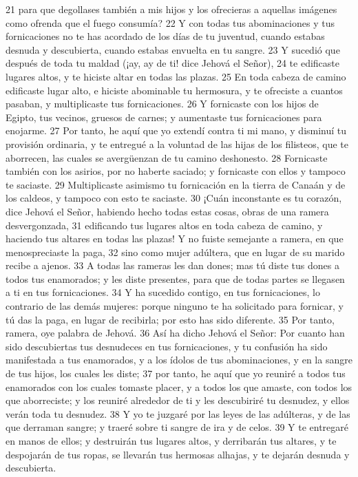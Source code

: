 21 para que degollases también a mis hijos y los ofrecieras a aquellas imágenes como ofrenda que el fuego consumía?
22 Y con todas tus abominaciones y tus fornicaciones no te has acordado de los días de tu juventud, cuando estabas desnuda y descubierta, cuando estabas envuelta en tu sangre.
23 Y sucedió que después de toda tu maldad (¡ay, ay de ti! dice Jehová el Señor),
24 te edificaste lugares altos, y te hiciste altar en todas las plazas.
25 En toda cabeza de camino edificaste lugar alto, e hiciste abominable tu hermosura, y te ofreciste a cuantos pasaban, y multiplicaste tus fornicaciones.
26 Y fornicaste con los hijos de Egipto, tus vecinos, gruesos de carnes; y aumentaste tus fornicaciones para enojarme.
27 Por tanto, he aquí que yo extendí contra ti mi mano, y disminuí tu provisión ordinaria, y te entregué a la voluntad de las hijas de los filisteos, que te aborrecen, las cuales se avergüenzan de tu camino deshonesto.
28 Fornicaste también con los asirios, por no haberte saciado; y fornicaste con ellos y tampoco te saciaste.
29 Multiplicaste asimismo tu fornicación en la tierra de Canaán y de los caldeos, y tampoco con esto te saciaste.
30 ¡Cuán inconstante es tu corazón, dice Jehová el Señor, habiendo hecho todas estas cosas, obras de una ramera desvergonzada,
31 edificando tus lugares altos en toda cabeza de camino, y haciendo tus altares en todas las plazas! Y no fuiste semejante a ramera, en que menospreciaste la paga,
32 sino como mujer adúltera, que en lugar de su marido recibe a ajenos.
33 A todas las rameras les dan dones; mas tú diste tus dones a todos tus enamorados; y les diste presentes, para que de todas partes se llegasen a ti en tus fornicaciones.
34 Y ha sucedido contigo, en tus fornicaciones, lo contrario de las demás mujeres: porque ninguno te ha solicitado para fornicar, y tú das la paga, en lugar de recibirla; por esto has sido diferente.
35 Por tanto, ramera, oye palabra de Jehová.
36 Así ha dicho Jehová el Señor: Por cuanto han sido descubiertas tus desnudeces en tus fornicaciones, y tu confusión ha sido manifestada a tus enamorados, y a los ídolos de tus abominaciones, y en la sangre de tus hijos, los cuales les diste;
37 por tanto, he aquí que yo reuniré a todos tus enamorados con los cuales tomaste placer, y a todos los que amaste, con todos los que aborreciste; y los reuniré alrededor de ti y les descubiriré tu desnudez, y ellos verán toda tu desnudez.
38 Y yo te juzgaré por las leyes de las adúlteras, y de las que derraman sangre; y traeré sobre ti sangre de ira y de celos.
39 Y te entregaré en manos de ellos; y destruirán tus lugares altos, y derribarán tus altares, y te despojarán de tus ropas, se llevarán tus hermosas alhajas, y te dejarán desnuda y descubierta.
